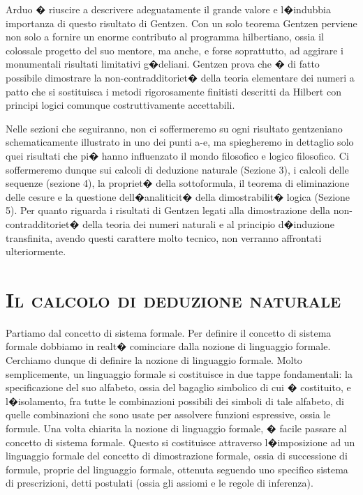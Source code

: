 \documentclass[a4paper,12pt]{aphex}
\begin{document}
\begin{itemize}
Arduo � riuscire a descrivere adeguatamente il grande valore e l�indubbia importanza di questo risultato di Gentzen. Con un solo teorema Gentzen perviene non solo a fornire un enorme contributo al programma hilbertiano, ossia il colossale progetto del suo mentore, ma anche, e forse soprattutto, ad aggirare i monumentali risultati limitativi g�deliani. Gentzen prova che � di fatto  possibile dimostrare la non-contradditoriet� della teoria elementare dei numeri a patto che si sostituisca i metodi rigorosamente finitisti descritti da Hilbert con principi logici comunque costruttivamente accettabili. 

\end{itemize}

Nelle sezioni che seguiranno, non ci soffermeremo su ogni risultato gentzeniano schematicamente illustrato in uno dei punti a-e, ma spiegheremo in dettaglio solo quei risultati che pi� hanno influenzato il mondo filosofico e logico filosofico. Ci soffermeremo dunque sui calcoli di deduzione naturale (Sezione 3), i calcoli delle sequenze (sezione 4), la propriet� della sottoformula, il teorema di eliminazione delle cesure e la questione dell�analiticit� della dimostrabilit� logica (Sezione 5). Per quanto riguarda i risultati di Gentzen legati alla dimostrazione della non-contradditoriet� della teoria dei numeri naturali e al principio d�induzione transfinita, avendo questi carattere molto tecnico, non verranno affrontati ulteriormente.

\vspace{0.2cm}


\section{\textsc{Il calcolo di deduzione naturale}}


Partiamo dal concetto di sistema formale. Per definire il concetto di sistema formale dobbiamo in realt� cominciare dalla nozione di linguaggio formale. Cerchiamo dunque di definire la nozione di linguaggio formale. Molto semplicemente, un linguaggio formale si costituisce in due tappe fondamentali: la specificazione del suo alfabeto, ossia del bagaglio simbolico di cui � costituito, e l�isolamento, fra tutte le combinazioni possibili dei simboli di tale alfabeto, di quelle combinazioni  che sono usate per assolvere funzioni espressive, ossia le formule. 
Una volta chiarita la nozione di linguaggio formale, � facile passare al concetto di sistema formale. Questo si costituisce attraverso l�imposizione ad un linguaggio formale del concetto di dimostrazione formale, ossia di successione di formule, proprie del linguaggio formale, ottenuta seguendo uno specifico sistema di prescrizioni, detti postulati (ossia gli assiomi e le regole di inferenza). 
\end{document}
